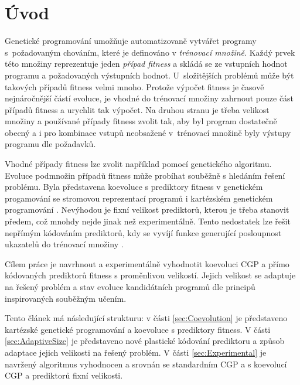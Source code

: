 \documentclass[fleqn,11pt]{ExcelAtFIT} %
\affiliation{*%
  \href{mailto:xwigla00@stud.fit.vutbr.cz}{xwigla00@stud.fit.vutbr.cz},
  \textit{Fakulta informačních technologií, Vysoké učení technické v Brně}}
\begin{document}
\startdocument



\section{Úvod}

Genetické programování umožňuje automatizovaně vytvářet programy s~požadovaným chováním, které je definováno v \emph{trénovací množině}. Každý prvek této množiny reprezentuje jeden \emph{případ fitness} a skládá se ze vstupních hodnot programu a požadovaných výstupních hodnot. U~složitějších problémů může být takových případů fitness velmi mnoho. Protože výpočet fitness je časově nejnáročnější částí evoluce, je vhodné do trénovací množiny zahrnout pouze část případů fitness a urychlit tak výpočet. Na druhou stranu je třeba velikost množiny a používané případy fitness zvolit tak, aby byl program dostatečně obecný a i pro kombinace vstupů neobsažené v~trénovací množině byly výstupy programu dle požadavků.

Vhodné případy fitness lze zvolit například pomocí genetického algoritmu. Evoluce podmnožin případů fitness může probíhat souběžně s hledáním řešení problému. Byla představena koevoluce s prediktory fitness v genetickém progamování se stromovou reprezentací programů \cite{Schmidt} i kartézském genetickém programování \cite{SikuEuroGP}. Nevýhodou je fixní velikost prediktorů, kterou je třeba stanovit předem, což mnohdy nejde jinak než experimentálně. Tento nedostatek lze řešit nepřímým kódováním prediktorů, kdy se vyvíjí funkce generující posloupnost ukazatelů do trénovací množiny \cite{SikuHulva}.

Cílem práce je navrhnout a experimentálně vyhodnotit koevoluci CGP a přímo kódovaných prediktorů fitness s proměnlivou velikostí. Jejich velikost se adaptuje na řešený problém a stav evoluce kandidátních programů dle principů inspirovaných souběžným učením.

Tento článek má následující strukturu: v části \ref{sec:Coevolution} je představeno kartézské genetické programování a koevoluce s prediktory fitness. V části \ref{sec:AdaptiveSize} je představeno nové plastické kódování prediktoru a způsob adaptace jejich velikosti na řešený problém. V části \ref{sec:Experimental} je navržený algoritmus vyhodnocen a srovnán se standardním CGP a s koevolucí CGP a prediktorů fixní velikosti.
\end{document}
